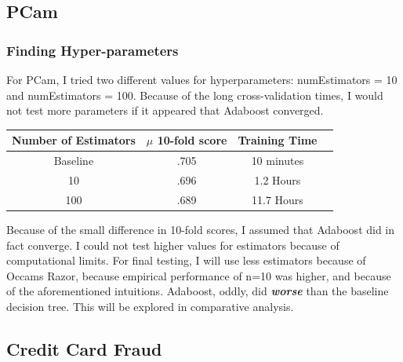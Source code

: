 \documentclass[a4paper]{article}
\begin{document}
\subsection{PCam}
\subsubsection{Finding Hyper-parameters}
For PCam, I tried two different values for hyperparameters: numEstimators = 10 and numEstimators = 100. Because of the long cross-validation times, I would not test more parameters if it appeared that Adaboost converged.

\begin{center}
\begin{tabular}{ |c|c|c|c| } 
\hline
Number of Estimators & \begin{math}\mu\end{math} 10-fold score & Training Time \\
\hline
Baseline & .705 & 10 minutes \\ 
10 & .696 & 1.2 Hours\\ 
100 & .689 & 11.7 Hours\\ 

\hline
\end{tabular}
\end{center}
Because of the small difference in 10-fold scores, I assumed that Adaboost did in fact converge. I could not test higher values for estimators because of computational limits. For final testing, I will use less estimators because of Occams Razor, because empirical performance of n=10 was higher, and because of the aforementioned intuitions. Adaboost, oddly, did \textbf{\textit{worse}} than the baseline decision tree. This will be explored in comparative analysis.
\subsection{Credit Card Fraud}
\end{document}
